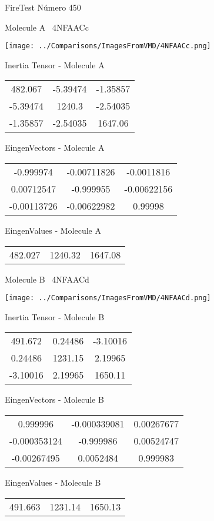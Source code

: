 \vtab[-3cm]
\begin{center}
{\large FireTest \tab Número 450}
\end{center}
\begin{multicols}{2}
\begin{center}

Molecule A \
4NFAACc

\texttt{[image: ../Comparisons/ImagesFromVMD/4NFAACc.png]}

Inertia Tensor - Molecule A \\
\begin{tabular}{|c c c|}
482.067	 & 	-5.39474	 & 	-1.35857	 \\
-5.39474	 & 	1240.3	 & 	-2.54035	 \\
-1.35857	 & 	-2.54035	 & 	1647.06
\end{tabular}

\vtab
 EingenVectors - Molecule A     \\
\begin{tabular}{|c c c|}
-0.999974	 & 	-0.00711826	 & 	-0.0011816	 \\
0.00712547	 & 	-0.999955	 & 	-0.00622156	 \\
-0.00113726	 & 	-0.00622982	 & 	0.99998
\end{tabular}

\vtab
 EingenValues - Molecule A     \\
\begin{tabular}{|c c c|}
482.027	 & 	1240.32	 & 	1647.08	 \\
\end{tabular}
\columnbreak

Molecule B \
4NFAACd

\texttt{[image: ../Comparisons/ImagesFromVMD/4NFAACd.png]}

Inertia Tensor - Molecule B \\
\begin{tabular}{|c c c|}
491.672	 & 	0.24486	 & 	-3.10016	 \\
0.24486	 & 	1231.15	 & 	2.19965	 \\
-3.10016	 & 	2.19965	 & 	1650.11
\end{tabular}

\vtab
 EingenVectors - Molecule B     \\
\begin{tabular}{|c c c|}
0.999996	 & 	-0.000339081	 & 	0.00267677	 \\
-0.000353124	 & 	-0.999986	 & 	0.00524747	 \\
-0.00267495	 & 	0.0052484	 & 	0.999983
\end{tabular}

\vtab
 EingenValues - Molecule B     \\
\begin{tabular}{|c c c|}
491.663	 & 	1231.14	 & 	1650.13	 \\
\end{tabular}

\end{center}
\end{multicols}

